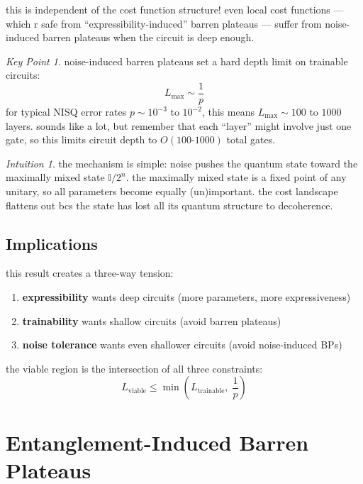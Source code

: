 \documentclass[11pt,a4paper]{article}
\theoremstyle{definition}
\theoremstyle{remark}
\newtheorem*{intuition}{Intuition}
\newtheorem*{keypoint}{Key Point}
\begin{document}
this is independent of the cost function structure! even local cost functions --- which r safe from ``expressibility-induced'' barren plateaus --- suffer from noise-induced barren plateaus when the circuit is deep enough.

\begin{keypoint}
noise-induced barren plateaus set a hard depth limit on trainable circuits:
\begin{equation}
    L_{\text{max}} \sim \frac{1}{p}
\end{equation}
for typical NISQ error rates $p \sim 10^{-3}$ to $10^{-2}$, this means $L_{\text{max}} \sim 100$ to $1000$ layers. sounds like a lot, but remember that each ``layer'' might involve just one gate, so this limits circuit depth to $O(100\text{-}1000)$ total gates.
\end{keypoint}

\begin{intuition}
the mechanism is simple: noise pushes the quantum state toward the maximally mixed state $\mathbb{I}/2^n$. the maximally mixed state is a fixed point of any unitary, so all parameters become equally (un)important. the cost landscape flattens out bcs the state has lost all its quantum structure to decoherence.
\end{intuition}

\subsection{Implications}

this result creates a three-way tension:

\begin{enumerate}[label=\arabic*.]
    \item \textbf{expressibility} wants deep circuits (more parameters, more expressiveness)
    \item \textbf{trainability} wants shallow circuits (avoid barren plateaus)
    \item \textbf{noise tolerance} wants even shallower circuits (avoid noise-induced BPs)
\end{enumerate}

the viable region is the intersection of all three constraints:
\begin{equation}
    L_{\text{viable}} \leq \min\left(L_{\text{trainable}}, \; \frac{1}{p}\right)
\end{equation}

\section{Entanglement-Induced Barren Plateaus}
\end{document}
